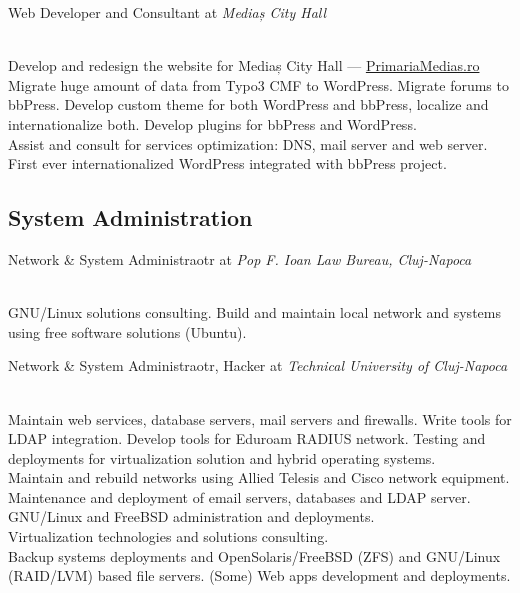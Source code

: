 \documentclass[10pt, a4paper]{article}
\newcommand{\years}[1]{\marginnote{\scriptsize #1}}
\begin{document}
\years{2007}Web Developer and Consultant at \emph{Mediaș City Hall}
\begin{footnotesize}
\\
 Develop and redesign the website for Mediaș City Hall --- \href{http://primariamedias.ro}{PrimariaMedias.ro}\\
 Migrate huge amount of data from Typo3 CMF to WordPress. Migrate forums to bbPress. Develop custom theme for both WordPress and bbPress, localize and internationalize both. Develop plugins for bbPress and WordPress.\\
 Assist and consult for services optimization: DNS, mail server and web server.\\
 First ever internationalized WordPress integrated with bbPress project.
\end{footnotesize}

\subsection*{System Administration}
\noindent
\years{2009-present}Network \& System Administraotr at \emph{Pop F. Ioan Law Bureau, Cluj-Napoca}
\begin{footnotesize}
\\
GNU/Linux solutions consulting. Build and maintain local network and systems using free software solutions (Ubuntu).
\end{footnotesize}

\years{2008-2009}Network \& System Administraotr, Hacker at \emph{Technical University of Cluj-Napoca}
\begin{footnotesize}
\\
Maintain web services, database servers, mail servers and firewalls. Write tools for LDAP integration. Develop tools for Eduroam RADIUS network. Testing and deployments for virtualization solution and hybrid operating systems.\\
Maintain and rebuild networks using Allied Telesis and Cisco network equipment. Maintenance and deployment of email servers, databases and LDAP server.\\
GNU/Linux and FreeBSD administration and deployments.\\
Virtualization technologies and solutions consulting.\\
Backup systems deployments and OpenSolaris/FreeBSD (ZFS) and GNU/Linux (RAID/LVM) based file servers. (Some) Web apps development and deployments.
\end{footnotesize}
\end{document}
